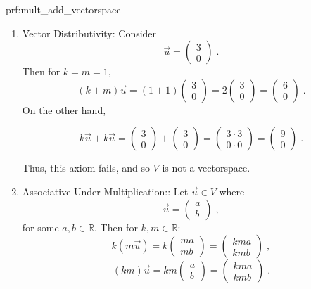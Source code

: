 \begin{prf}{prf:mult_add_vectorspace}
\begin{enumerate}
\item Vector Distributivity: Consider
$$\vec{u} = \begin{pmatrix}
3 \\
0
\end{pmatrix}\;.$$
Then for $k = m =1,$
$$(k+m) \vec{u} = (1+1) \begin{pmatrix}
3 \\
0
\end{pmatrix} = 2 \begin{pmatrix}
3 \\
0
\end{pmatrix} = \begin{pmatrix}
6 \\
0
\end{pmatrix}\;. $$
On the other hand,

$$k\vec{u}+ k\vec{u} = \begin{pmatrix}
3 \\
0
\end{pmatrix} + \begin{pmatrix}
3 \\
0
\end{pmatrix} = \begin{pmatrix}
3\cdot 3 \\
0 \cdot 0
\end{pmatrix} = \begin{pmatrix}
9 \\
0
\end{pmatrix}\;. $$

Thus, this axiom fails, and so $V$ is not a vectorspace.

\item Associative Under Multiplication:: Let $\vec{u} \in V$ where $$ \vec{u} = \begin{pmatrix}
a \\
b
\end{pmatrix}\;,$$
for some $a,b \in \mathbb{R}.$ Then for $k,m \in \mathbb{R}:$
$$k\left(m\vec{u}\right) = k \begin{pmatrix}
ma \\
mb
\end{pmatrix} = \begin{pmatrix}
kma \\
kmb
\end{pmatrix}\;, $$
$$\left(km\right)\vec{u} = km \begin{pmatrix}
a \\
b
\end{pmatrix} = \begin{pmatrix}
kma \\
kmb
\end{pmatrix}\;.$$


\end{enumerate}
\end{prf}
